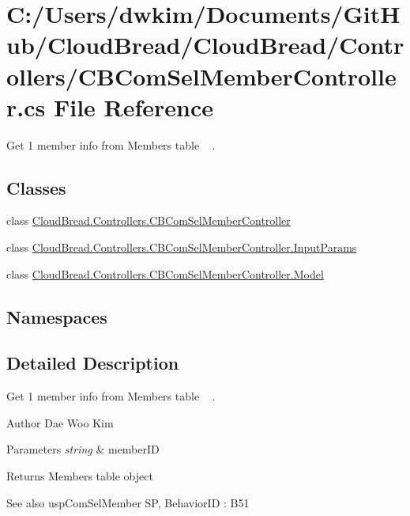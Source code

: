 \hypertarget{a00202}{}\section{C\+:/\+Users/dwkim/\+Documents/\+Git\+Hub/\+Cloud\+Bread/\+Cloud\+Bread/\+Controllers/\+C\+B\+Com\+Sel\+Member\+Controller.cs File Reference}
\label{a00202}


Get 1 member info from Members table ~\newline
.  


\subsection*{Classes}
\begin{DoxyCompactItemize}
\item 
class \hyperlink{a00029}{Cloud\+Bread.\+Controllers.\+C\+B\+Com\+Sel\+Member\+Controller}
\item 
class \hyperlink{a00095}{Cloud\+Bread.\+Controllers.\+C\+B\+Com\+Sel\+Member\+Controller.\+Input\+Params}
\item 
class \hyperlink{a00156}{Cloud\+Bread.\+Controllers.\+C\+B\+Com\+Sel\+Member\+Controller.\+Model}
\end{DoxyCompactItemize}
\subsection*{Namespaces}
\begin{DoxyCompactItemize}
\end{DoxyCompactItemize}


\subsection{Detailed Description}
Get 1 member info from Members table ~\newline
. 

\begin{DoxyAuthor}{Author}
Dae Woo Kim 
\end{DoxyAuthor}

\begin{DoxyParams}{Parameters}
{\em string} & member\+ID \\
\hline
\end{DoxyParams}
\begin{DoxyReturn}{Returns}
Members table object 
\end{DoxyReturn}
\begin{DoxySeeAlso}{See also}
usp\+Com\+Sel\+Member SP, Behavior\+ID \+: B51 
\end{DoxySeeAlso}
